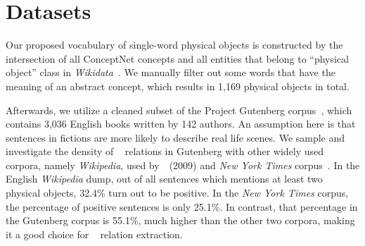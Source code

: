 \section{Datasets}
\label{sec:data}
Our proposed vocabulary of single-word physical objects is constructed by the intersection of all ConceptNet concepts and all entities that belong to ``physical object'' class in \textit{Wikidata}~\cite{VK:wikidata14}. 
We manually filter out some 
words that have the meaning of an abstract concept, which 
results in 1,169 physical objects in total.

Afterwards, we utilize a cleaned subset of the Project Gutenberg corpus~\cite{lahiri:2014:SRW}, which contains 3,036 English books written by 142 authors.
% 
An assumption here is that sentences in fictions are more likely to describe real life scenes. 
We sample and investigate the density of \lnear~ relations in Gutenberg with other 
widely used corpora, namely \textit{Wikipedia}, 
used by~\citeauthor{mintz2009distant}~(2009) and \textit{New York Times} corpus~\cite{riedel2010modeling}. 
In the English \textit{Wikipedia} dump, out of all sentences which mentions at least two
physical objects, 32.4\% turn out to be positive. 
In the \textit{New York Times} corpus,
the percentage of positive sentences is only 25.1\%. 
In contrast, that percentage in the Gutenberg corpus is 55.1\%, much higher 
than the other two corpora, making it a good choice for \lnear~ 
relation extraction.

